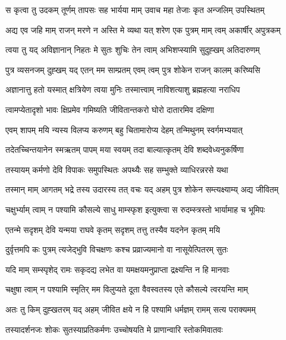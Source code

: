 \twolineshloka
{स कृत्वा तु उदकम् तूर्णम् तापसः सह भार्यया}
{माम् उवाच महा तेजाः कृत अन्जलिम् उपस्थितम्} %

\twolineshloka
{अद्य एव जहि माम् राजन् मरणे न अस्ति मे व्यथा}
{यत् शरेण एक पुत्रम् माम् त्वम् अकार्षीर् अपुत्रकम्} %

\twolineshloka
{त्वया तु यद् अविज्ञानान् निहतः मे सुतः शुचिः}
{तेन त्वाम् अभिशप्स्यामि सुदुह्खम् अतिदारुणम्} %

\twolineshloka
{पुत्र व्यसनजम् दुह्खम् यद् एतन् मम साम्प्रतम्}
{एवम् त्वम् पुत्र शोकेन राजन् कालम् करिष्यसि} %

\twolineshloka
{अज्ञानात्तु हतो यस्मात् क्षत्रियेण त्वया मुनिः}
{तस्मात्त्वाम् नाविशत्याशु ब्रह्महत्या नराधिप} %

\twolineshloka
{त्वामप्येतादृशो भावः क्षिप्रमेव गमिष्यति}
{जीवितान्तकरो घोरो दातारमिव दक्षिणा} %

\twolineshloka
{एवम् शापम् मयि न्यस्य विलप्य करुणम् बहु}
{चितामारोप्य देहम् तन्मिथुनम् स्वर्गमभ्ययात्} %

\twolineshloka
{तदेतच्चिन्तयानेन स्मऋतम् पापम् मया स्वयम्}
{तदा बाल्यात्कृतम् देवि शब्दवेध्यनुकर्षिणा} %

\twolineshloka
{तस्यायम् कर्मणो देवि विपाकः समुपस्थितः}
{अपथ्यैः सह सम्भुक्ते व्याधिरन्नरसे यथा} %

\twolineshloka
{तस्मान् माम् आगतम् भद्रे तस्य उदारस्य तत् वचः}
{यद् अहम् पुत्र शोकेन सम्त्यक्ष्याम्य् अद्य जीवितम्} %

\twolineshloka
{चक्षुर्भ्याम् त्वाम् न पश्यामि कौसल्ये साधु माम्स्फृश}
{इत्युक्त्वा स रुदम्स्त्रस्तो भार्यामाह च भूमिपः} %

\twolineshloka
{एतन्मे सदृशम् देवि यन्मया राघवे कृतम्}
{सदृशम् तत्तु तस्यैव यदनेन कृतम् मयि} %

\twolineshloka
{दुर्वृत्तमपि कः पुत्रम् त्यजेद्भुवि विचक्षणः}
{कश्च प्रव्राज्यमानो वा नासूयेत्पितरम् सुतः} %

\twolineshloka
{यदि माम् सम्स्पृशेद् रामः सकृदद्य लभेत वा}
{यमक्षयमनुप्राप्ता द्रक्ष्यन्ति न हि मानवाः} %

\twolineshloka
{चक्षुषा त्वाम् न पश्यामि स्मृतिर् मम विलुप्यते}
{दूता वैवस्वतस्य एते कौसल्ये त्वरयन्ति माम्} %

\twolineshloka
{अतः तु किम् दुह्खतरम् यद् अहम् जीवित क्षये}
{न हि पश्यामि धर्मज्ञम् रामम् सत्य पराक्यमम्} %

\twolineshloka
{तस्यादर्शनजः शोकः सुतस्याप्रतिकर्मणः}
{उच्चोषयति मे प्राणान्वारि स्तोकमिवातवः} %

